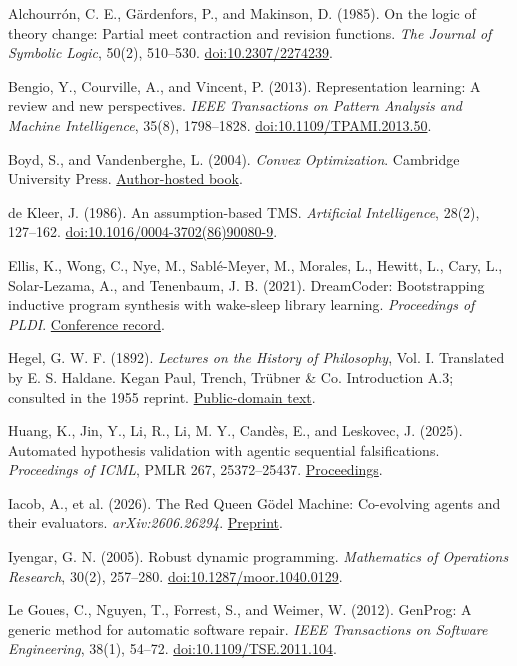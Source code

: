 \documentclass[twoside,11pt]{article}
\begin{document}
Alchourrón, C. E., Gärdenfors, P., and Makinson, D. (1985). On the logic of theory change: Partial meet contraction and revision functions. \emph{The Journal of Symbolic Logic}, 50(2), 510–530. \href{https://doi.org/10.2307/2274239}{doi:10.2307/2274239}.


Bengio, Y., Courville, A., and Vincent, P. (2013). Representation learning: A review and new perspectives. \emph{IEEE Transactions on Pattern Analysis and Machine Intelligence}, 35(8), 1798–1828. \href{https://doi.org/10.1109/TPAMI.2013.50}{doi:10.1109/TPAMI.2013.50}.


Boyd, S., and Vandenberghe, L. (2004). \emph{Convex Optimization}. Cambridge University Press. \href{https://web.stanford.edu/~boyd/cvxbook/bv_cvxbook.pdf}{Author-hosted book}.


de Kleer, J. (1986). An assumption-based TMS. \emph{Artificial Intelligence}, 28(2), 127–162. \href{https://doi.org/10.1016/0004-3702(86)90080-9}{doi:10.1016/0004-3702(86)90080-9}.


Ellis, K., Wong, C., Nye, M., Sablé-Meyer, M., Morales, L., Hewitt, L., Cary, L., Solar-Lezama, A., and Tenenbaum, J. B. (2021). DreamCoder: Bootstrapping inductive program synthesis with wake-sleep library learning. \emph{Proceedings of PLDI}. \href{https://www.pldi21.org/poster_pldi.355.html}{Conference record}.


Hegel, G. W. F. (1892). \emph{Lectures on the History of Philosophy}, Vol. I. Translated by E. S. Haldane. Kegan Paul, Trench, Trübner \& Co. Introduction A.3; consulted in the 1955 reprint. \href{https://www.gutenberg.org/files/51635/51635-h/51635-h.htm}{Public-domain text}.


Huang, K., Jin, Y., Li, R., Li, M. Y., Candès, E., and Leskovec, J. (2025). Automated hypothesis validation with agentic sequential falsifications. \emph{Proceedings of ICML}, PMLR 267, 25372–25437. \href{https://proceedings.mlr.press/v267/huang25n.html}{Proceedings}.


Iacob, A., et al. (2026). The Red Queen Gödel Machine: Co-evolving agents and their evaluators. \emph{arXiv:2606.26294}. \href{https://arxiv.org/abs/2606.26294}{Preprint}.


Iyengar, G. N. (2005). Robust dynamic programming. \emph{Mathematics of Operations Research}, 30(2), 257–280. \href{https://doi.org/10.1287/moor.1040.0129}{doi:10.1287/moor.1040.0129}.


Le Goues, C., Nguyen, T., Forrest, S., and Weimer, W. (2012). GenProg: A generic method for automatic software repair. \emph{IEEE Transactions on Software Engineering}, 38(1), 54–72. \href{https://doi.org/10.1109/TSE.2011.104}{doi:10.1109/TSE.2011.104}.
\end{document}
